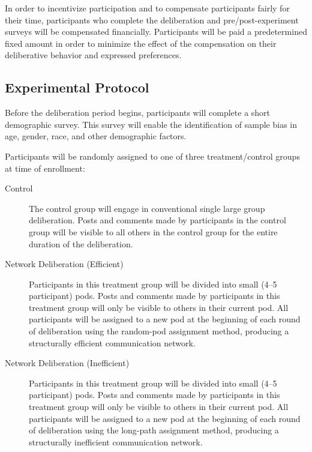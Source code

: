 In order to incentivize participation and to compensate participants fairly
for their time,
participants who complete the deliberation and pre/post-experiment surveys
will be compensated financially.
Participants will be paid a predetermined fixed amount in order to
minimize the effect of the compensation on their deliberative behavior and
expressed preferences.


\subsection{Experimental Protocol}

Before the deliberation period begins,
participants will complete a short demographic survey.
This survey will enable the identification of sample bias in age, gender, race,
and other demographic factors.

Participants will be randomly assigned to one of three treatment/control groups
at time of enrollment:
\begin{description}
\item[Control]{
The control group will engage in conventional single large group deliberation.
Posts and comments made by participants in the control group will be visible
to all others in the control group for the entire duration of the deliberation.}
\item[Network Deliberation (Efficient)]{
Participants in this treatment group will be divided into small
(4--5 participant) pods.
Posts and comments made by participants in this treatment group will only be
visible to others in their current pod.
All participants will be assigned to a new pod at the beginning of each round
of deliberation using the random-pod assignment method,
producing a structurally efficient communication network.}
\item[Network Deliberation (Inefficient)]{
Participants in this treatment group will be divided into small
(4--5 participant) pods.
Posts and comments made by participants in this treatment group will only be
visible to others in their current pod.
All participants will be assigned to a new pod at the beginning of each round
of deliberation using the long-path assignment method,
producing a structurally inefficient communication network.}
\end{description}

